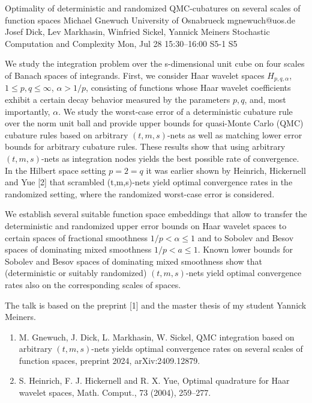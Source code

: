 \begin{talk}
  {Optimality of deterministic and randomized QMC-cubatures on several scales of function spaces}%
  {Michael Gnewuch}%
  {University of Osnabrueck}%
  {mgnewuch@uos.de}%
  {Josef Dick, Lev Markhasin, Winfried Sickel, Yannick Meiners}%
  {Stochastic Computation and Complexity}%
  {Mon, Jul 28 15:30--16:00}%
  {S5-1}%
  {S5}%
    
   
   
We study the integration problem over the s-dimensional unit cube on four scales of Banach spaces of integrands. First, we consider Haar wavelet spaces $H_{p, q, \alpha}$, $1\le p, q \le \infty$, $\alpha > 1/p$, consisting of functions whose Haar wavelet coefficients exhibit a certain decay behavior measured by the parameters $p,q$, and, most importantly, $\alpha$.  We study the worst-case error of a deterministic cubature rule over the norm unit ball 
and provide upper bounds for quasi-Monte Carlo (QMC) cubature rules based on arbitrary $(t,m,s)$-nets as well as matching lower error bounds for arbitrary cubature rules. These results show that using arbitrary $(t,m,s)$-nets as integration nodes yields the best possible rate of convergence. In the Hilbert space setting $p=2 = q$ it was earlier shown by Heinrich, Hickernell and Yue [2]  that scrambled (t,m,s)-nets yield optimal convergence rates in the randomized setting, where the randomized worst-case error is considered. 

We establish several suitable function space embeddings that allow to transfer the deterministic and randomized upper error bounds on Haar wavelet spaces
to certain spaces of fractional smoothness $1/p < \alpha  \le 1$ and to Sobolev and Besov spaces of dominating mixed smoothness $1/p < a \le 1$.
Known lower bounds for Sobolev and Besov spaces of dominating mixed smoothness show that (deterministic or suitably randomized) $(t,m,s)$-nets yield optimal convergence rates also on the corresponding scales of spaces.   

The talk is based on the preprint [1] and the master thesis of my student Yannick Meiners.
\medskip

\begin{enumerate}
 \item[{[1]}] M. Gnewuch, J. Dick, L. Markhasin, W. Sickel, QMC integration based on arbitrary $(t,m,s)$-nets yields optimal convergence rates on several scales of function spaces, preprint 2024, arXiv:2409.12879. 
        \item[{[2]}] S. Heinrich, F. J. Hickernell and R. X. Yue, Optimal quadrature for Haar wavelet spaces, Math. Comput., 73 (2004), 259--277.
 \end{enumerate}
\end{talk}

